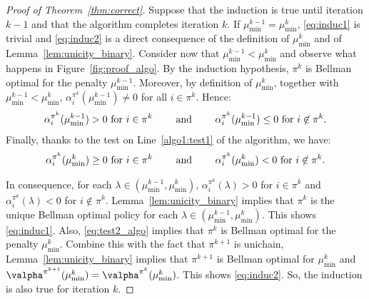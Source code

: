 \begin{proof}[Proof of Theorem~\ref{thm:correct}]
    Suppose that the induction is true until iteration $k-1$ and that the algorithm completes iteration $k$.  If $\mu^{k-1}_{\min}=\mu^k_{\min}$, \ref{eq:induc1} is trivial and \ref{eq:induc2} is a direct consequence of the definition of $\mu^k_{\min}$ and of Lemma~\ref{lem:unicity_binary}. Consider now that $\mu^{k-1}_{\min}<\mu^k_{\min}$ and observe what happens in Figure~\ref{fig:proof_algo}. By the induction hypothesis, $\pi^k$ is Bellman optimal for the penalty $\mu^{k-1}_{\min}$. Moreover, by definition of $\mu^k_{\min}$, together with $\mu^{k-1}_{\min}<\mu^k_{\min}$, $\alpha^{\pi^k}_i(\mu^{k-1}_{\min})\ne0$ for all $i\in\pi^k$. Hence:
    \begin{align*}
        \alpha^{\pi^{k}}_i(\mu^{k-1}_{\min})>0 \text{ for $i\in\pi^k$ \qquad and \qquad } \alpha^{\pi^{k}}_i(\mu^{k-1}_{\min})\le0\text{ for $i\not\in\pi^k$}.
    \end{align*}
    Finally, thanks to the test on Line~\ref{algo1:test1} of the algorithm, we have:
    \begin{align}
        \label{eq:test2_algo}
        \alpha^{\pi^{k}}_i(\mu^{k}_{\min})\ge0 \text{ for $i\in\pi^k$ \qquad and \qquad } \alpha^{\pi^{k}}_i(\mu^{k}_{\min})<0\text{ for $i\not\in\pi^k$}.
    \end{align}

    In consequence, for each $\lambda\in(\mu^{k-1}_{\min}, \mu^{k}_{\min})$, $\alpha^{\pi^{k}}_i(\lambda) >0$ for $i\in\pi^{k}$ and $\alpha^{\pi^{k}}_i(\lambda) <0$ for $i\notin\pi^{k}$. Lemma~\ref{lem:unicity_binary} implies that $\pi^{k}$ is the unique Bellman optimal policy for each $\lambda\in(\mu^{k-1}_{\min}, \mu^{k}_{\min})$. 
    This shows \ref{eq:induc1}.
    Also, \eqref{eq:test2_algo} implies that $\pi^{k}$ is Bellman optimal for the penalty $\mu^{k}_{\min}$. Combine this with the fact that $\pi^{k+1}$ is unichain, Lemma~\ref{lem:unicity_binary} implies that $\pi^{k+1}$ is Bellman optimal for $\mu^{k}_{\min}$ and $\valpha^{\pi^{k+1}}(\mu^{k}_{\min}) =\valpha^{\pi^{k}}(\mu^{k}_{\min})$.
    This shows \ref{eq:induc2}.
    So, the induction is also true for iteration $k$.


\end{proof}

